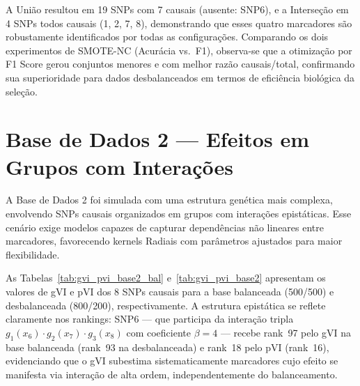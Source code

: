\documentclass[
    12pt,
    a4paper,
    oneside,
    english,
    french,
    spanish,
    brazil
    ]{abntex2}
\newcommand{\novo}[1]{\textcolor{corNova}{#1}}
\begin{document}
\novo{A União resultou em 19 SNPs com 7 causais (ausente: SNP6), e a Interseção em 4 SNPs todos causais (1, 2, 7, 8), demonstrando que esses quatro marcadores são robustamente identificados por todas as configurações. Comparando os dois experimentos de SMOTE-NC (Acurácia vs.\ F1), observa-se que a otimização por F1 Score gerou conjuntos menores e com melhor razão causais/total, confirmando sua superioridade para dados desbalanceados em termos de eficiência biológica da seleção.}

\chapter{Base de Dados 2 --- Efeitos em Grupos com Interações}

\novo{A Base de Dados 2 foi simulada com uma estrutura genética mais complexa, envolvendo SNPs causais organizados em grupos com interações epistáticas. Esse cenário exige modelos capazes de capturar dependências não lineares entre marcadores, favorecendo kernels Radiais com parâmetros ajustados para maior flexibilidade.}

\novo{As Tabelas~\ref{tab:gvi_pvi_base2_bal} e~\ref{tab:gvi_pvi_base2} apresentam os valores de gVI e pVI dos 8 SNPs causais para a base balanceada (500/500) e desbalanceada (800/200), respectivamente. A estrutura epistática se reflete claramente nos rankings: SNP6 --- que participa da interação tripla $g_1(x_6) \cdot g_2(x_7) \cdot g_3(x_8)$ com coeficiente $\beta=4$ --- recebe rank~97 pelo gVI na base balanceada (rank~93 na desbalanceada) e rank~18 pelo pVI (rank~16), evidenciando que o gVI subestima sistematicamente marcadores cujo efeito se manifesta via interação de alta ordem, independentemente do balanceamento.}
\end{document}
